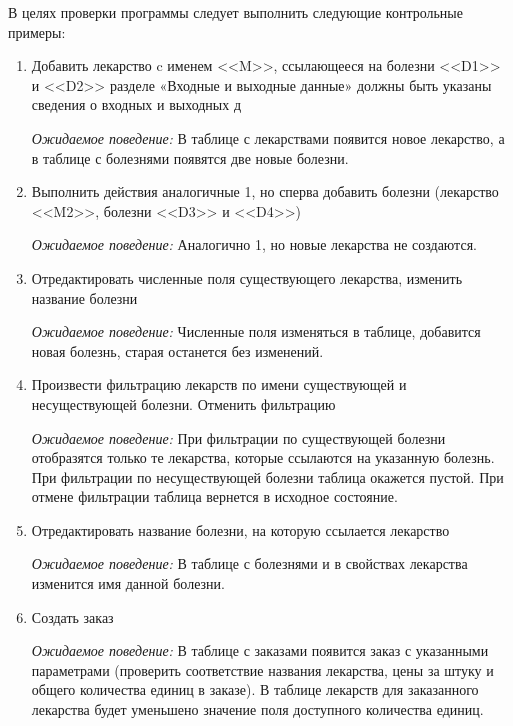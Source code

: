 В целях проверки программы следует выполнить следующие контрольные примеры:
\begin{enumerate}
    \item Добавить лекарство c именем <<M>>, ссылающееся на болезни <<D1>> и
        <<D2>> разделе  «Входные  и  выходные  данные»  должны  быть  указаны
        сведения о входных и выходных д

        \textit{Ожидаемое поведение:} В таблице с лекарствами появится новое
        лекарство, а в таблице с болезнями появятся две новые болезни.

    \item Выполнить действия аналогичные 1, но сперва добавить болезни
        (лекарство <<M2>>, болезни <<D3>> и <<D4>>)

        \textit{Ожидаемое поведение:} Аналогично 1, но новые лекарства не
        создаются.

    \item Отредактировать численные поля существующего лекарства, изменить
        название болезни

        \textit{Ожидаемое поведение:} Численные поля изменяться в таблице,
        добавится новая болезнь, старая останется без изменений.

    \item Произвести фильтрацию лекарств по имени существующей и несуществующей
        болезни. Отменить фильтрацию

        \textit{Ожидаемое поведение:} При фильтрации по существующей болезни
        отобразятся только те лекарства, которые ссылаются на указанную
        болезнь. При фильтрации по несуществующей болезни таблица окажется
        пустой. При отмене фильтрации таблица вернется в исходное состояние.

    \item Отредактировать название болезни, на которую ссылается лекарство

        \textit{Ожидаемое поведение:} В таблице с болезнями и в свойствах
        лекарства изменится имя данной болезни.

    \item Создать заказ

        \textit{Ожидаемое поведение:} В таблице с заказами появится заказ с
        указанными параметрами (проверить соответствие названия лекарства, цены
        за штуку и общего количества единиц в заказе). В таблице лекарств для
        заказанного лекарства будет уменьшено значение поля доступного
        количества единиц.


\end{enumerate}
